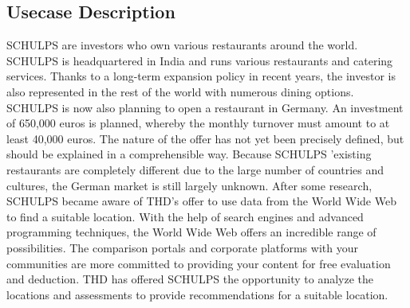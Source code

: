 \subsection{Usecase Description}
\label{subsec:usecase}
SCHULPS are investors who own various restaurants around the world. SCHULPS is headquartered in India and runs various restaurants and catering services. Thanks to a long-term expansion policy in recent years, the investor is also represented in the rest of the world with numerous dining options. SCHULPS is now also planning to open a restaurant in Germany. An investment of 650,000 euros is planned, whereby the monthly turnover must amount to at least 40,000 euros. The nature of the offer has not yet been precisely defined, but should be explained in a comprehensible way. Because SCHULPS 'existing restaurants are completely different due to the large number of countries and cultures, the German market is still largely unknown. After some research, SCHULPS became aware of THD's offer to use data from the World Wide Web to find a suitable location. With the help of search engines and advanced programming techniques, the World Wide Web offers an incredible range of possibilities. The comparison portals and corporate platforms with your communities are more committed to providing your content for free evaluation and deduction.
THD has offered SCHULPS the opportunity to analyze the locations and assessments to provide recommendations for a suitable location.
